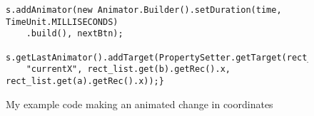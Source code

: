 \begin{figure}
\begin{center}
\begin{verbatim}
s.addAnimator(new Animator.Builder().setDuration(time, TimeUnit.MILLISECONDS)
	.build(), nextBtn);

s.getLastAnimator().addTarget(PropertySetter.getTarget(rect_list.get(b), 
	"currentX", rect_list.get(b).getRec().x, rect_list.get(a).getRec().x));}
\end{verbatim}
\end{center}
\caption{My example code making an animated change in coordinates}
\label{fig:gPrototype}
\end{figure}